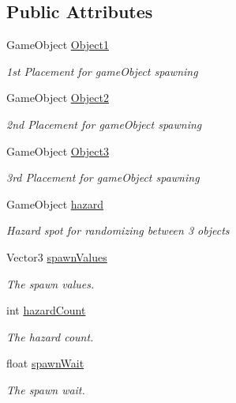 \subsection*{Public Attributes}
\begin{DoxyCompactItemize}
\item 
Game\-Object \hyperlink{classGameController_ae2d31db5ff00946e41b2dcd7ddda941a}{Object1}
\begin{DoxyCompactList}\small\item\em 1st Placement for game\-Object spawning \end{DoxyCompactList}\item 
Game\-Object \hyperlink{classGameController_ab5c9311e9997c3d8a34833b3760f28f8}{Object2}
\begin{DoxyCompactList}\small\item\em 2nd Placement for game\-Object spawning \end{DoxyCompactList}\item 
Game\-Object \hyperlink{classGameController_a9956f5a361f097e051a144a2b787e5ca}{Object3}
\begin{DoxyCompactList}\small\item\em 3rd Placement for game\-Object spawning \end{DoxyCompactList}\item 
Game\-Object \hyperlink{classGameController_a77c185a594a084fe342e8de517808654}{hazard}
\begin{DoxyCompactList}\small\item\em Hazard spot for randomizing between 3 objects \end{DoxyCompactList}\item 
Vector3 \hyperlink{classGameController_a5e4f56c23896d4b528da579f93335896}{spawn\-Values}
\begin{DoxyCompactList}\small\item\em The spawn values. \end{DoxyCompactList}\item 
int \hyperlink{classGameController_a973f0e7d25e3b260cf0aa51730584ada}{hazard\-Count}
\begin{DoxyCompactList}\small\item\em The hazard count. \end{DoxyCompactList}\item 
float \hyperlink{classGameController_a27c91a14de3982813ad3d8245d0134d7}{spawn\-Wait}
\begin{DoxyCompactList}\small\item\em The spawn wait. \end{DoxyCompactList}\item 

\end{DoxyCompactItemize}
